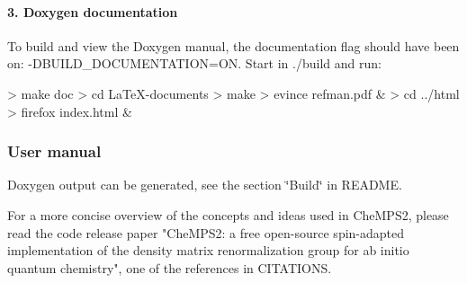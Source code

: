 \paragraph*{3. Doxygen documentation}

To build and view the Doxygen manual, the documentation flag should have been on\-: {\ttfamily -\/\-D\-B\-U\-I\-L\-D\-\_\-\-D\-O\-C\-U\-M\-E\-N\-T\-A\-T\-I\-O\-N=O\-N}. Start in {\ttfamily ./build} and run\-: \begin{DoxyVerb}> make doc
> cd LaTeX-documents
> make
> evince refman.pdf &
> cd ../html
> firefox index.html &
\end{DoxyVerb}


\subsubsection*{User manual}

Doxygen output can be generated, see the section \char`\"{}\-Build\char`\"{} in R\-E\-A\-D\-M\-E.

For a more concise overview of the concepts and ideas used in Che\-M\-P\-S2, please read the code release paper "Che\-M\-P\-S2\-: a free open-\/source spin-\/adapted implementation of the density matrix renormalization group for ab initio quantum chemistry", one of the references in C\-I\-T\-A\-T\-I\-O\-N\-S. 
